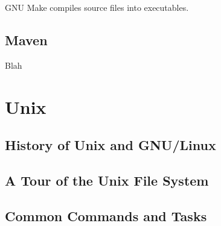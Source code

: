 GNU Make compiles source files into executables.



\subsection{Maven}

Blah


\toclineskip
\section{Unix}



\subsection{History of Unix and GNU/Linux}


\subsection{A Tour of the Unix File System}



\subsection{Common Commands and Tasks}


